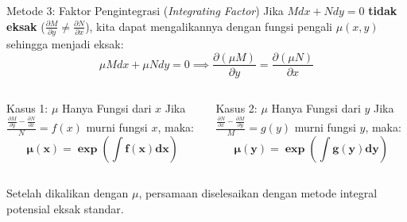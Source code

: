 \documentclass[aspectratio=169,10pt]{beamer}
\begin{document}
\begin{frame}{Metode 3: Faktor Pengintegrasi (\textit{Integrating Factor})}
  Jika $M dx + N dy = 0$ \textbf{tidak eksak} ($\frac{\partial M}{\partial y} \neq \frac{\partial N}{\partial x}$), kita dapat mengalikannya dengan fungsi pengali $\mu(x,y)$ sehingga menjadi eksak:
  \begin{equation*}
    \mu M dx + \mu N dy = 0 \implies \frac{\partial (\mu M)}{\partial y} = \frac{\partial (\mu N)}{\partial x}
  \end{equation*}
  \begin{columns}[t]
    \begin{block}{Kasus 1: $\mu$ Hanya Fungsi dari $x$}
      Jika $\frac{\frac{\partial M}{\partial y} - \frac{\partial N}{\partial x}}{N} = f(x)$ murni fungsi $x$, maka:
      \begin{equation*}
        \mathbf{\mu(x) = \exp\left( \int f(x) dx \right)}
      \end{equation*}
    \end{block}

    \begin{exampleblock}{Kasus 2: $\mu$ Hanya Fungsi dari $y$}
      Jika $\frac{\frac{\partial N}{\partial x} - \frac{\partial M}{\partial y}}{M} = g(y)$ murni fungsi $y$, maka:
      \begin{equation*}
        \mathbf{\mu(y) = \exp\left( \int g(y) dy \right)}
      \end{equation*}
    \end{exampleblock}
  \end{columns}
  \vspace{0.2cm}
  \footnotesize Setelah dikalikan dengan $\mu$, persamaan diselesaikan dengan metode integral potensial eksak standar.
\end{frame}
\end{document}
